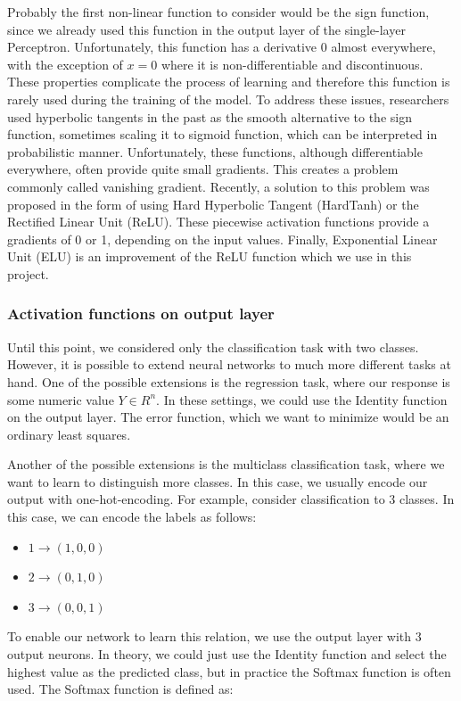 
Probably the first non-linear function to consider would be the sign function, since we already used this function in the output layer of the single-layer Perceptron.
Unfortunately, this function has a derivative 0 almost everywhere, with the exception of $x=0$ where it is non-differentiable and discontinuous.
These properties complicate the process of learning and therefore this function is rarely used during the training of the model.
To address these issues, researchers used hyperbolic tangents in the past as the smooth alternative to the sign function, sometimes scaling it to sigmoid function, which can be interpreted in probabilistic manner.
Unfortunately, these functions, although differentiable everywhere, often provide quite small gradients.
This creates a problem commonly called vanishing gradient.
Recently, a solution to this problem was proposed in the form of using Hard Hyperbolic Tangent (HardTanh) or the Rectified Linear Unit (ReLU).
These piecewise activation functions provide a gradients of 0 or 1, depending on the input values.
Finally, Exponential Linear Unit (ELU) is an improvement of the ReLU function which we use in this project. 
\subsubsection{Activation functions on output layer}
Until this point, we considered only the classification task with two classes.
However, it is possible to extend neural networks to much more different tasks at hand.
One of the possible extensions is the regression task, where our response is some numeric value $Y \in R^n$.
In these settings, we could use the Identity function on the output layer.
The error function, which we want to minimize would be an ordinary least squares. 

Another of the possible extensions is the multiclass classification task, where we want to learn to distinguish more classes.
In this case, we usually encode our output with one-hot-encoding.
For example, consider classification to 3 classes.
In this case, we can encode the labels as follows:
\begin{itemize}
    \item $1 \to (1, 0, 0)$ 
    \item $2 \to (0, 1, 0)$
    \item $3 \to (0, 0, 1)$
\end{itemize}
To enable our network to learn this relation, we use the output layer with 3 output neurons.
In theory, we could just use the Identity function and select the highest value as the predicted class, but in practice the Softmax function is often used.
The Softmax function is defined as:

